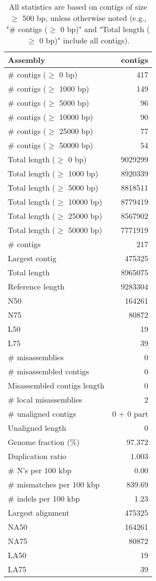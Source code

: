 \documentclass[12pt,a4paper]{article}
\begin{document}
\begin{table}[ht]
\begin{center}
\caption{All statistics are based on contigs of size $\geq$ 500 bp, unless otherwise noted (e.g., "\# contigs ($\geq$ 0 bp)" and "Total length ($\geq$ 0 bp)" include all contigs).}
\begin{tabular}{|l*{1}{|r}|}
\hline
Assembly & contigs \\ \hline
\# contigs ($\geq$ 0 bp) & 417 \\ \hline
\# contigs ($\geq$ 1000 bp) & 149 \\ \hline
\# contigs ($\geq$ 5000 bp) & 96 \\ \hline
\# contigs ($\geq$ 10000 bp) & 90 \\ \hline
\# contigs ($\geq$ 25000 bp) & 77 \\ \hline
\# contigs ($\geq$ 50000 bp) & 54 \\ \hline
Total length ($\geq$ 0 bp) & 9029299 \\ \hline
Total length ($\geq$ 1000 bp) & 8920339 \\ \hline
Total length ($\geq$ 5000 bp) & 8818511 \\ \hline
Total length ($\geq$ 10000 bp) & 8779419 \\ \hline
Total length ($\geq$ 25000 bp) & 8567902 \\ \hline
Total length ($\geq$ 50000 bp) & 7771919 \\ \hline
\# contigs & 217 \\ \hline
Largest contig & 475325 \\ \hline
Total length & 8965075 \\ \hline
Reference length & 9283304 \\ \hline
N50 & 164261 \\ \hline
N75 & 80872 \\ \hline
L50 & 19 \\ \hline
L75 & 39 \\ \hline
\# misassemblies & 0 \\ \hline
\# misassembled contigs & 0 \\ \hline
Misassembled contigs length & 0 \\ \hline
\# local misassemblies & 2 \\ \hline
\# unaligned contigs & 0 + 0 part \\ \hline
Unaligned length & 0 \\ \hline
Genome fraction (\%) & 97.372 \\ \hline
Duplication ratio & 1.003 \\ \hline
\# N's per 100 kbp & 0.00 \\ \hline
\# mismatches per 100 kbp & 839.69 \\ \hline
\# indels per 100 kbp & 1.23 \\ \hline
Largest alignment & 475325 \\ \hline
NA50 & 164261 \\ \hline
NA75 & 80872 \\ \hline
LA50 & 19 \\ \hline
LA75 & 39 \\ \hline
\end{tabular}
\end{center}
\end{table}
\end{document}
